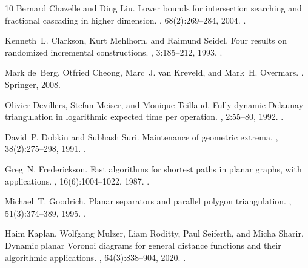 \documentclass[10pt,a4paper]{amsart}
\begin{document}
\begin{thebibliography}{10}
Bernard Chazelle and Ding Liu.
\newblock Lower bounds for intersection searching and fractional cascading in
  higher dimension.
, 68(2):269--284, 2004.
\newblock \href {https://doi.org/10.1016/j.jcss.2003.07.003}
  {}.

Kenneth~L. Clarkson, Kurt Mehlhorn, and Raimund Seidel.
\newblock Four results on randomized incremental constructions.
, 3:185--212, 1993.
\newblock \href {https://doi.org/10.1016/0925-7721(93)90009-U}
  {}.

Mark de~Berg, Otfried Cheong, Marc~J. van Kreveld, and Mark~H. Overmars.
.
\newblock Springer, 2008.

Olivier Devillers, Stefan Meiser, and Monique Teillaud.
\newblock Fully dynamic {D}elaunay triangulation in logarithmic expected time
  per operation.
, 2:55--80, 1992.
\newblock \href {https://doi.org/10.1016/0925-7721(92)90025-N}
  {}.

David~P. Dobkin and Subhash Suri.
\newblock Maintenance of geometric extrema.
, 38(2):275--298, 1991.
\newblock \href {https://doi.org/10.1145/103516.103518}
  {}.

Greg~N. Frederickson.
\newblock Fast algorithms for shortest paths in planar graphs, with
  applications.
, 16(6):1004--1022, 1987.
\newblock \href {https://doi.org/10.1137/0216064} {}.

Michael~T. Goodrich.
\newblock Planar separators and parallel polygon triangulation.
, 51(3):374--389, 1995.
\newblock \href {https://doi.org/10.1006/jcss.1995.1076}
  {}.

Haim Kaplan, Wolfgang Mulzer, Liam Roditty, Paul Seiferth, and Micha Sharir.
\newblock Dynamic planar {V}oronoi diagrams for general distance functions and
  their algorithmic applications.
, 64(3):838--904, 2020.
\newblock \href {https://doi.org/10.1007/s00454-020-00243-7}
  {}.


\end{thebibliography}
\end{document}
